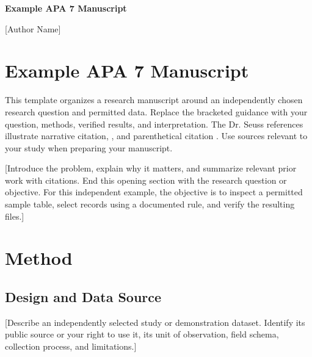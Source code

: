 \documentclass[12pt,letterpaper]{article}
\newcommand{\papertitle}{Example APA 7 Manuscript}
\newcommand{\authorname}{[Author Name]}
\newcommand{\reportdate}{[Month Day, Year]}
\newif\ifincludeabstract
\begin{document}
\begin{center}
\vspace*{2\baselineskip}
\textbf{\papertitle}\par
\vspace{\baselineskip}
\authorname\par
\reportdate\par
\end{center}
\newpage

\ifincludeabstract
\section*{Abstract}
\noindent [Write one unindented paragraph summarizing the purpose, design,
data, methods, principal results, and conclusion. Use the target publication's word limit. Replace this instruction only after verifying the results.]
\par\noindent\textit{Keywords:} [term one], [term two], [term three]
\newpage
\fi

\section*{\papertitle}
This template organizes a research manuscript around an independently chosen
research question and permitted data. Replace the bracketed guidance
with your question, methods, verified results, and interpretation. The
Dr. Seuss references illustrate narrative citation, \textcite{seuss1957cat},
and parenthetical citation \parencite{seuss1971lorax}. Use sources relevant
to your study when preparing your manuscript.

[Introduce the problem, explain why it matters, and summarize relevant prior
work with citations. End this opening section with the research question or
objective. For this independent example, the objective is to inspect a permitted sample table,
select records using a documented rule, and verify the resulting files.]

\section{Method}
\subsection{Design and Data Source}
[Describe an independently selected study or demonstration dataset. Identify
its public source or your right to use it, its unit of observation, field
schema, collection process, and limitations.]
\end{document}
